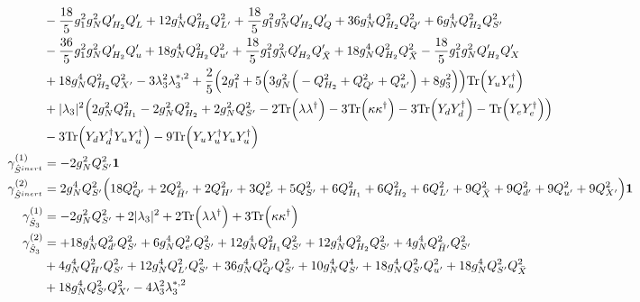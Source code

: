 {\begin{align}
 &-\frac{18}{5} g_{1}^{2} g_{N}^{2} Q_{H_2}' Q_L' +12 g_{N}^{4} Q_{H_2}^{2} Q_{L'}^{2} +\frac{18}{5} g_{1}^{2} g_{N}^{2} Q_{H_2}' Q_Q' +36 g_{N}^{4} Q_{H_2}^{2} Q_{Q'}^{2} +6 g_{N}^{4} Q_{H_2}^{2} Q_{S'}^{2} \nonumber \\ 
 &-\frac{36}{5} g_{1}^{2} g_{N}^{2} Q_{H_2}' Q_u' +18 g_{N}^{4} Q_{H_2}^{2} Q_{u'}^{2} +\frac{18}{5} g_{1}^{2} g_{N}^{2} Q_{H_2}' Q_{\bar{X}}' +18 g_{N}^{4} Q_{H_2}^{2} Q_{\bar{X}}^{2} -\frac{18}{5} g_{1}^{2} g_{N}^{2} Q_{H_2}' Q_X' \nonumber \\ 
 &+18 g_{N}^{4} Q_{H_2}^{2} Q_{X'}^{2} -3 \lambda_{3}^{2} \lambda_{3}^{*,2} +\frac{2}{5} \Big(2 g_{1}^{2}  + 5 \Big(3 g_{N}^{2} \Big(- Q_{H_2}^{2}  + Q_{Q'}^{2} + Q_{u'}^{2}\Big) + 8 g_{3}^{2} \Big)\Big)\mbox{Tr}\Big({Y_u  Y_{u}^{\dagger}}\Big) \nonumber \\ 
 &+|\lambda_3|^2 \Big(2 g_{N}^{2} Q_{H_1}^{2}  -2 g_{N}^{2} Q_{H_2}^{2}  + 2 g_{N}^{2} Q_{S'}^{2}  -2 \mbox{Tr}\Big({\lambda  \lambda^{\dagger}}\Big)  -3 \mbox{Tr}\Big({\kappa  \kappa^{\dagger}}\Big)  -3 \mbox{Tr}\Big({Y_d  Y_{d}^{\dagger}}\Big)  - \mbox{Tr}\Big({Y_e  Y_{e}^{\dagger}}\Big) \Big)\nonumber \\ 
 &-3 \mbox{Tr}\Big({Y_d  Y_{d}^{\dagger}  Y_u  Y_{u}^{\dagger}}\Big) -9 \mbox{Tr}\Big({Y_u  Y_{u}^{\dagger}  Y_u  Y_{u}^{\dagger}}\Big) \\ 
\gamma_{\hat{S}^{inert}}^{(1)} & =  
-2 g_{N}^{2} Q_{S'}^{2} {\bf 1} \\ 
\gamma_{\hat{S}^{inert}}^{(2)} & =  
2 g_{N}^{4} Q_{S'}^{2} \Big(18 Q_{Q'}^{2}  + 2 Q_{\bar{H}'}^{2}  + 2 Q_{H'}^{2}  + 3 Q_{e'}^{2}  + 5 Q_{S'}^{2}  + 6 Q_{H_1}^{2}  + 6 Q_{H_2}^{2}  + 6 Q_{L'}^{2}  + 9 Q_{\bar{X}}^{2}  + 9 Q_{d'}^{2}  + 9 Q_{u'}^{2}  + 9 Q_{X'}^{2} \Big){\bf 1} \\ 
\gamma_{\hat{S}_3}^{(1)} & =  
-2 g_{N}^{2} Q_{S'}^{2}  + 2 |\lambda_3|^2  + 2 \mbox{Tr}\Big({\lambda  \lambda^{\dagger}}\Big)  + 3 \mbox{Tr}\Big({\kappa  \kappa^{\dagger}}\Big) \\ 
\gamma_{\hat{S}_3}^{(2)} & =  
+18 g_{N}^{4} Q_{d'}^{2} Q_{S'}^{2} +6 g_{N}^{4} Q_{e'}^{2} Q_{S'}^{2} +12 g_{N}^{4} Q_{H_1}^{2} Q_{S'}^{2} +12 g_{N}^{4} Q_{H_2}^{2} Q_{S'}^{2} +4 g_{N}^{4} Q_{\bar{H}'}^{2} Q_{S'}^{2} \nonumber \\ 
 &+4 g_{N}^{4} Q_{H'}^{2} Q_{S'}^{2} +12 g_{N}^{4} Q_{L'}^{2} Q_{S'}^{2} +36 g_{N}^{4} Q_{Q'}^{2} Q_{S'}^{2} +10 g_{N}^{4} Q_{S'}^{4} +18 g_{N}^{4} Q_{S'}^{2} Q_{u'}^{2} +18 g_{N}^{4} Q_{S'}^{2} Q_{\bar{X}}^{2} \nonumber \\ 
 &+18 g_{N}^{4} Q_{S'}^{2} Q_{X'}^{2} -4 \lambda_{3}^{2} \lambda_{3}^{*,2} \nonumber \\ 

\end{align}}
